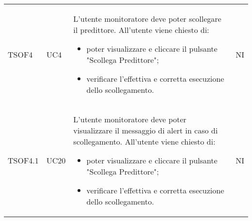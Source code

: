 \begin{longtable}{C{2.5cm} C{2.5cm} L{8cm} C{2cm}}
TSOF4 &
UC4 &
L'utente monitoratore deve poter scollegare il predittore. All'utente viene chiesto di:
\begin{itemize}
	\item poter visualizzare e cliccare il pulsante "Scollega Predittore";
	\item verificare l'effettiva e corretta esecuzione dello scollegamento.
\end{itemize}&
NI \\


TSOF4.1 &
UC20 &
L'utente monitoratore deve poter visualizzare il messaggio di alert in caso di scollegamento. All'utente viene chiesto di:
\begin{itemize}
	\item poter visualizzare e cliccare il pulsante "Scollega Predittore";
	\item verificare l'effettiva e corretta esecuzione dello scollegamento.
\end{itemize}&
NI \\



\end{longtable}
